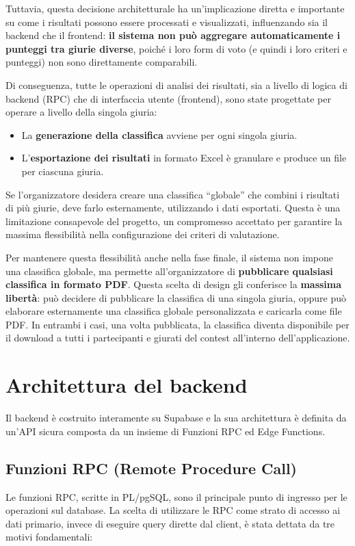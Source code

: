 Tuttavia, questa decisione architetturale ha un'implicazione diretta e importante su come i risultati possono essere processati e visualizzati, influenzando sia il backend che il frontend: \textbf{il sistema non può aggregare automaticamente i punteggi tra giurie diverse}, poiché i loro form di voto (e quindi i loro criteri e punteggi) non sono direttamente comparabili.

Di conseguenza, tutte le operazioni di analisi dei risultati, sia a livello di logica di backend (RPC) che di interfaccia utente (frontend), sono state progettate per operare a livello della singola giuria:
\begin{itemize}
	\item La \textbf{generazione della classifica} avviene per ogni singola giuria.
    \item L'\textbf{esportazione dei risultati} in formato Excel è granulare e produce un file per ciascuna giuria.
\end{itemize}
Se l'organizzatore desidera creare una classifica ``globale'' che combini i risultati di più giurie, deve farlo esternamente, utilizzando i dati esportati.
Questa è una limitazione consapevole del progetto, un compromesso accettato per garantire la massima flessibilità nella configurazione dei criteri di valutazione.

Per mantenere questa flessibilità anche nella fase finale, il sistema non impone una classifica globale, ma permette all'organizzatore di \textbf{pubblicare qualsiasi classifica in formato PDF}.
Questa scelta di design gli conferisce la \textbf{massima libertà}: può decidere di pubblicare la classifica di una singola giuria, oppure può elaborare esternamente una classifica globale personalizzata e caricarla come file PDF. In entrambi i casi, una volta pubblicata, la classifica diventa disponibile per il download a tutti i partecipanti e giurati del contest all'interno dell'applicazione.

\section{Architettura del backend}\label{sec:architettura-del-backend}
Il backend è costruito interamente su Supabase e la sua architettura è definita da un'API sicura composta da un insieme di Funzioni RPC ed Edge Functions.

\subsection{Funzioni RPC (Remote Procedure Call)}\label{subsec:funzioni-rpc-(remote-procedure-call)}
Le funzioni RPC, scritte in PL/pgSQL, sono il principale punto di ingresso per le operazioni sul database.
La scelta di utilizzare le RPC come strato di accesso ai dati primario, invece di eseguire query dirette dal client, è stata dettata da tre motivi fondamentali:

